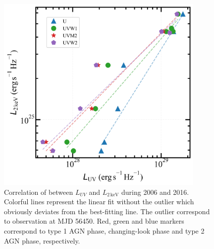 \documentclass[twocolumn]{aastex63}
\begin{document}
\begin{figure}
\centering
	\includegraphics[width=0.9\textwidth]{./pic/Mrk1018_L2_uvot_correlation-fig-without-outlier.png}
    \caption{Correlation of  between $L_{UV}$ and $L_\mathrm{2\,keV}$ during 2006 and 2016. Colorful lines represent the linear fit without the outlier which obviously deviates from the best-fitting line. The outlier correspond to observation at MJD 56450. Red, green and blue markers correspond to type 1 AGN phase, changing-look phase and type 2 AGN phase, respectively. }
    \label{fig:correlation-Luvot-L2keV}
\end{figure}
\end{document}
